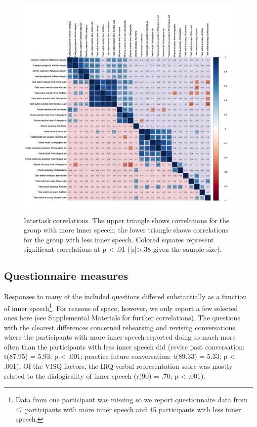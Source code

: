 \documentclass[
  man,a4paper,floatsintext]{apa6}
\begin{document}
\begin{figure}[!ht]
\includegraphics[width=1\linewidth]{../figures/cor_plot_contrast_v2} \caption{Intertask correlations. The upper triangle shows correlations for the group with more inner speech; the lower triangle shows correlations for the group with less inner speech.
Colored squares represent significant correlations at p < .01 (|r|>.38 given the sample size).}\label{fig:total-cor-contrast}
\end{figure}

\newpage

\hypertarget{questionnaire-measures}{%
\subsection{Questionnaire measures}\label{questionnaire-measures}}

Responses to many of the included questions differed substantially as a function of inner speech\footnote{Data from one participant was missing so we report questionnaire data from 47 participants with more inner speech and 45 participants with less inner speech.}. For reasons of space, however, we only report a few selected ones here (see Supplemental Materials for further correlations). The questions with the clearest differences concerned rehearsing and revising conversations where the participants with more inner speech reported doing so much more often than the participants with less inner speech did (revise past conversation: t(87.95) = 5.93; p \textless{} .001; practice future conversation: t(89.33) = 5.33; p \textless{} .001). Of the VISQ factors, the IRQ verbal representation score was mostly related to the dialogicality of inner speech (r(90) = .70; p \textless{} .001).
\end{document}
